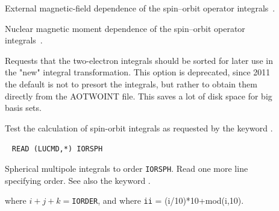 \begin{description}
\item[] External magnetic-field dependence of the spin--orbit
operator integrals~\cite{jvkrovjcp111}.


\item[] Nuclear magnetic moment dependence of the spin--orbit
operator integrals~\cite{jvkrovjcc20}.


\item[]\label{key:SORT_I} Requests that the
two-electron integrals should be sorted for later use in the "new"
integral transformation. This option is deprecated, since
2011 the default is not to presort the integrals, but rather to
obtain them directly from the AOTWOINT file. This saves a lot of disk
space for big basis sets.

\item[] Test the calculation of spin-orbit integrals as
requested by the keyword .

\item[]\verb| |\newline
\verb|READ (LUCMD,*) IORSPH|

Spherical multipole integrals to order
\verb|IORSPH|. Read one more
line specifying order. See also the keyword .

where $i+j+k =$\verb|IORDER|, and where \verb|ii| = (i/10)*10+mod(i,10).


\end{description}
